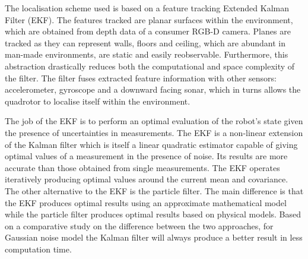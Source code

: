 \documentclass[]{article}
\begin{document}
{%



The localisation scheme used is based on a feature tracking Extended Kalman Filter (EKF). The features tracked are planar surfaces within the environment, which are obtained from depth data of a consumer RGB-D camera. Planes are tracked as they can represent walls, floors and ceiling, which are abundant in man-made environments, are static and easily reobservable. Furthermore, this abstraction drastically reduces both the computational and space complexity of the filter. The filter fuses extracted feature information with other sensors: accelerometer, gyroscope and a downward facing sonar, which in turns allows the quadrotor to localise itself within the environment.

The job of the EKF is to perform an optimal evaluation of the robot's state given the presence of uncertainties in measurements. The EKF is a non-linear extension of the Kalman filter which is itself a linear quadratic estimator capable of giving optimal values of a measurement in the presence of noise. Its results are more accurate than those obtained from single measurements. The EKF operates iteratively producing optimal values around the current mean and covariance. The other alternative to the EKF is the particle filter. The main difference is that the EKF produces optimal results using an approximate mathematical model while the particle filter produces optimal results based on physical models.
Based on a comparative study \cite{CompareFilters} on the difference between the two approaches, for Gaussian noise model the Kalman filter will always produce a better result in less computation time.

}
\end{document}
